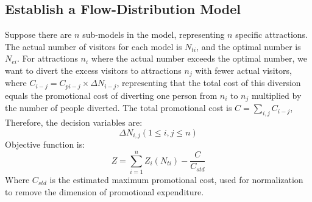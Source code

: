 \documentclass[12pt]{article}  %
\begin{document}
\subsection{Establish a Flow-Distribution Model}
Suppose there are $n$ sub-models in the model, representing $n$ specific attractions.
The actual number of visitors for each model is $N_{ti}$, and the optimal number is $N_{ei}$. For attractions $n_i$ where the actual number exceeds the optimal number, we want to divert the excess visitors to attractions $n_j$ with fewer actual visitors, where
$C_{i-j} = C_{pi-j}\times \Delta N_{i-j}$, representing that the total cost of this diversion equals the promotional cost of diverting one person from $n_i$ to $n_j$ multiplied by the number of people diverted. The total promotional cost is $C = \sum_{i,j} C_{i-j}$,
Therefore, the decision variables are:
\begin{equation}
    \Delta N_{i,j} (1 \leq i,j \leq n)
\end{equation}
Objective function is:
\begin{equation}
	Z = \sum_{i=1}^{n} Z_i(N_{ti}) - \frac{C}{C_{std}}
\end{equation}
Where $C_{std}$ is the estimated maximum promotional cost, used for normalization to remove the dimension of promotional expenditure.
\end{document}
